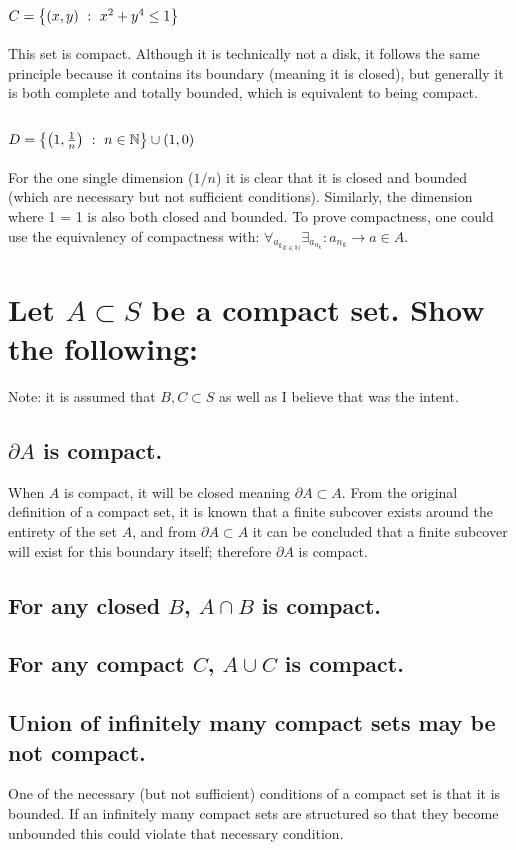 \documentclass[]{article}
\newcommand{\N}{\mathbb{N}}
\newcommand{\st}{\ : \ }
\begin{document}
\subsection{$C = \qty{(x,y) \st x^2+y^4 \leq 1}$}
This set is compact. Although it is technically not a disk, it follows the same principle because it contains its boundary (meaning it is closed), but generally it is both complete and totally bounded, which is equivalent to being compact.

\subsection{$D = \qty{\qty(1,\frac{1}{n}) \st n \in \N} \cup (1,0)$}
For the one single dimension ($1/n$) it is clear that it is closed and bounded (which are necessary but not sufficient conditions). 
Similarly, the dimension where 1 = 1 is also both closed and bounded. 
To prove compactness, one could use the equivalency of compactness with: $\forall_{{a_k}_{k\in \N}} \exists_{{a_{n_k}}} : a_{n_k} \to a \in A$.

\newpage
\section{Let $A \subset S$ be a compact set. Show the following:}
Note: it is assumed that $B, C \subset S$ as well as I believe that was the intent.
\subsection{$\partial A$ is compact.}
When $A$ is compact, it will be closed meaning $\partial A \subset A$. 
From the original definition of a compact set, it is known that a finite subcover exists around the entirety of the set $A$, and from $\partial A \subset A$ it can be concluded that a finite subcover will exist for this boundary itself; therefore $\partial A$ is compact.

\subsection{For any closed $B$, $A \cap B$ is compact.}




\subsection{For any compact $C$, $A \cup C$ is compact.}




\subsection{Union of infinitely many compact sets may be not compact.}
One of the necessary (but not sufficient) conditions of a compact set is that it is bounded. If an infinitely many compact sets are structured so that they become unbounded this could violate that necessary condition.
\end{document}
